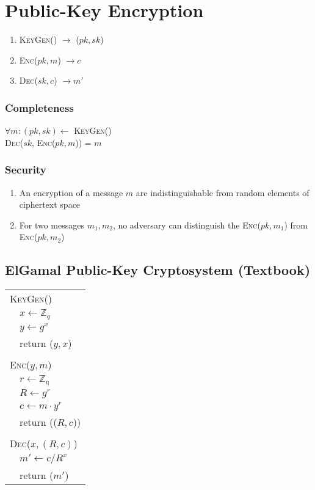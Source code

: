 \documentclass{report}
\begin{document}
\section{Public-Key Encryption}
\begin{adjustwidth}{2em}{2em}
	\begin{enumerate}[-]
		\item \textsc{KeyGen}() $\rightarrow$ ($pk, sk$)
		\item \textsc{Enc}($pk, m$) $\rightarrow c$
		\item \textsc{Dec}($sk, c$) $\rightarrow m'$
	\end{enumerate}
	\subsubsection{Completeness}
	\begin{adjustwidth}{2em}{}
		$\forall m: (pk, sk) \leftarrow$ \textsc{KeyGen}() \\
		\textsc{Dec}($sk$, \textsc{Enc}($pk,m$)) = $m$
	\end{adjustwidth}
	\subsubsection{Security}
	\begin{adjustwidth}{2em}{}
		\begin{enumerate}[-]
			\item An encryption of a message $m$ are indistinguishable from random elements of ciphertext space
			\item For two messages $m_1, m_2$, no adversary can distinguish the \textsc{Enc}($pk, m_1$) from \textsc{Enc}($pk, m_2$)
		\end{enumerate}
	\end{adjustwidth}
	\subsection{ElGamal Public-Key Cryptosystem (Textbook)}
	\begin{adjustwidth}{2em}{}
		\begin{tabular}{ll}
			\multicolumn{2}{l}{\textsc{KeyGen}()} \\
			& $x \leftarrow \mathbb{Z}_q$ \\
			& $y \leftarrow g^x$ \\
			& return ($y, x$) \\
			\\
			\multicolumn{2}{l}{\textsc{Enc}($y, m$)} \\
			& $r \leftarrow \mathbb{Z_q}$ \\
			& $R \leftarrow g^r$ \\
			& $c \leftarrow m \cdot y^r$ \\
			& return (($R, c$)) \\
			\\
			\multicolumn{2}{l}{\textsc{Dec}($x, (R,c)$)} \\
			& $m' \leftarrow c/R^x$ \\
			& return ($m'$) \\
		\end{tabular}

\end{adjustwidth}
\end{adjustwidth}
\end{document}
